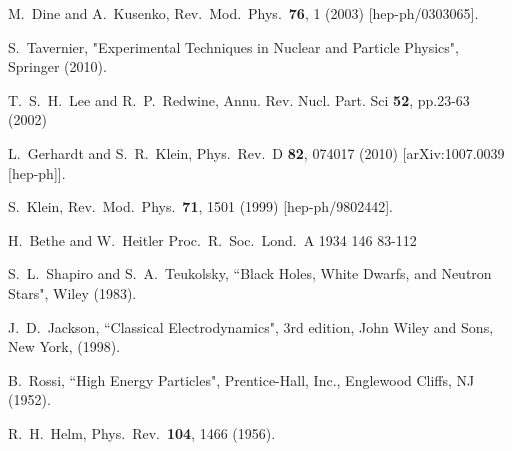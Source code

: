   M.~Dine and A.~Kusenko,
  Rev.\ Mod.\ Phys.\  {\bf 76}, 1 (2003)
  [hep-ph/0303065].


S.~Tavernier, "Experimental Techniques in Nuclear and Particle Physics", Springer (2010).

T.~S.~H.~Lee and R.~P.~Redwine,
 Annu. Rev. Nucl. Part. Sci {\bf 52}, pp.23-63 (2002)


  L.~Gerhardt and S.~R.~Klein,
  Phys.\ Rev.\ D {\bf 82}, 074017 (2010)
  [arXiv:1007.0039 [hep-ph]].


  S.~Klein,
  Rev.\ Mod.\ Phys.\  {\bf 71}, 1501 (1999)
  [hep-ph/9802442].


  H.~Bethe and W.~Heitler
  Proc.\ R.\ Soc.\ Lond.\ A 1934 146 83-112

S.~L.~Shapiro and S.~A.~Teukolsky, ``Black Holes, White Dwarfs, and Neutron Stars", Wiley (1983).

J.~D.~Jackson, ``Classical Electrodynamics", 3rd edition, John Wiley and Sons, New
York, (1998).

B.~Rossi, ``High Energy Particles", Prentice-Hall, Inc., Englewood Cliffs, NJ (1952).

  R.~H.~Helm,
  Phys.\ Rev.\  {\bf 104}, 1466 (1956).



